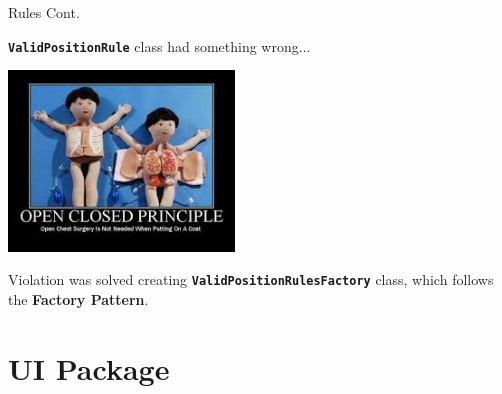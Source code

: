 \documentclass{beamer}
\begin{document}
  \begin{frame} {Rules Cont.}

    \textbf{\texttt{ValidPositionRule}} class had something wrong...

    \vspace{1em}


    \pause
    \hfill
    \includegraphics[width=0.45\textwidth]{img/openclosedprinciple.jpeg}

    \pause

    \vspace{1em}

    Violation was solved creating \textbf{\texttt{ValidPositionRulesFactory}} class, which follows the \textbf{Factory Pattern}.

  \end{frame}



\section{UI Package}
\end{document}
